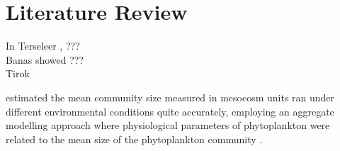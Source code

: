 \section{Literature Review}


In Terseleer \citet{Terseleer_2014}, ???\\

Banas \citet{Banas_2011} showed ??? \\

Tirok \citet{Tirok_2011} 

\citet{Wirtz_Sommer_2013} estimated the mean community size measured in mesocosm units ran under different environmental conditions quite accurately, employing an aggregate modelling approach where physiological parameters of phytoplankton were related to the mean size of the phytoplankton community \cite{Wirtz_2013}.

\cite{Ward_2013}